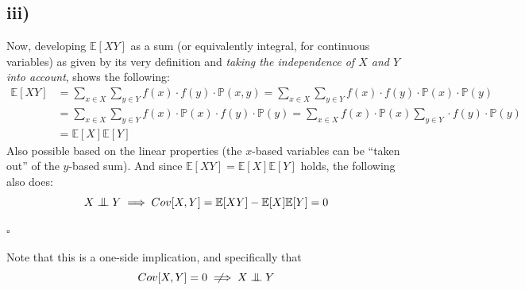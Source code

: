 \documentclass[11pt]{scrartcl} %
\newcommand{\CI}{\mathrel{\text{\scalebox{1.07}{$\perp\mkern-10mu\perp$}}}} %
\newcommand{\notimplies}{%
  \mathrel{{\ooalign{\hidewidth$\not\phantom{=}$\hidewidth\cr$\implies$}}}}
\begin{document}
\subsection*{iii)}
Now, developing \(\mathbb{E}[XY]\) as a sum (or equivalently integral, for continuous variables) as given by its very definition and {\it taking the independence of \(X\) and \(Y\) into account}, shows the following:
\begin{equation}\label{eq:5}
  \begin{split}
    \mathbb{E}[XY] &= \sum_{x\in X}\sum_{y\in Y} f(x)\cdot f(y)\cdot\mathbb{P}(x, y) = \sum_{x\in X}\sum_{y\in Y} f(x)\cdot f(y)\cdot\mathbb{P}(x)\cdot\mathbb{P}(y)\\
    &= \sum_{x\in X}\sum_{y\in Y} f(x)\cdot\mathbb{P}(x)\cdot f(y)\cdot\mathbb{P}(y) = \sum_{x\in X}f(x)\cdot\mathbb{P}(x)\sum_{y\in Y}\cdot f(y)\cdot\mathbb{P}(y)\\
    &= \mathbb{E}[X]\mathbb{E}[Y]
  \end{split}
\end{equation}
Also possible based on the linear properties (the \(x\)-based variables can be ``taken out'' of the \(y\)-based sum). And since \(\mathbb{E}[XY]=\mathbb{E}[X]\mathbb{E}[Y]\) holds, the following also does:
\begin{equation}\label{eq:6}
  X\CI Y \implies Cov[X,Y] = \mathbb{E}[XY]-\mathbb{E}[X]\mathbb{E}[Y] = 0
\end{equation}
\begin{flushright}
  $\square$\\
\end{flushright}
Note that this is a one-side implication, and specifically that
\begin{equation}\label{eq:7}
  Cov[X,Y] = 0 \notimplies X\CI Y 
\end{equation}






\vspace{5mm}
\end{document}
